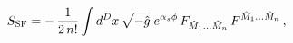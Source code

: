 \begin{equation}
    \label{eq:saction}
    S_{\rm SF} = - \, {1 \over 2 \, n!} \int d^Dx \,
    \sqrt{- \hat{g}} \;e^{\alpha_s \phi}
    \, F_{\hat{M}_1...\hat{M}_n} \, F^{\hat{M}_1...\hat{M}_n} \, ,
\end{equation}

